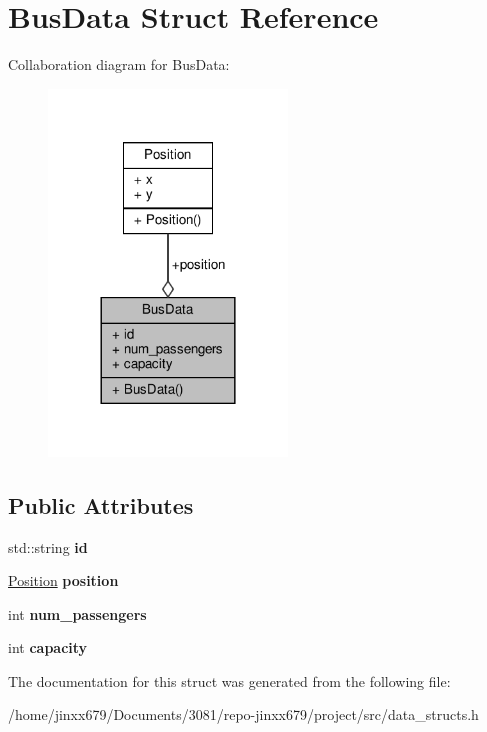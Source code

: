 \hypertarget{structBusData}{}\section{Bus\+Data Struct Reference}
\label{structBusData}


Collaboration diagram for Bus\+Data\+:\nopagebreak
\begin{figure}[H]
\begin{center}
\leavevmode
\includegraphics[width=180pt]{structBusData__coll__graph}
\end{center}
\end{figure}
\subsection*{Public Attributes}
\begin{DoxyCompactItemize}
\item 
\mbox{\label{structBusData_aaae4f1be20f1ee54bb4dd773b8580069}} 
std\+::string {\bfseries id}
\item 
\mbox{\label{structBusData_ae56b05c0d23a89ced4a0333bd65f0c96}} 
\hyperlink{structPosition}{Position} {\bfseries position}
\item 
\mbox{\label{structBusData_a4293fd5e2ffdcdd1b02a9e56f27230ec}} 
int {\bfseries num\+\_\+passengers}
\item 
\mbox{\label{structBusData_a84ea609f6ecc9b96e1ce37b47d2127a1}} 
int {\bfseries capacity}
\end{DoxyCompactItemize}


The documentation for this struct was generated from the following file\+:\begin{DoxyCompactItemize}
\item 
/home/jinxx679/\+Documents/3081/repo-\/jinxx679/project/src/data\+\_\+structs.\+h\end{DoxyCompactItemize}
